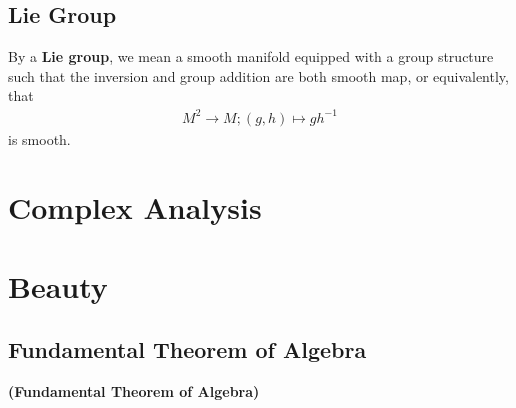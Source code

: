 \documentclass{report}
\begin{document}
\section{Lie Group}
\begin{mdframed}
By a \textbf{Lie group}, we mean a smooth manifold equipped with a group structure such that the inversion and group addition are both smooth map, or equivalently, that 
\begin{align*}
M^2\rightarrow  M; (g,h)\mapsto gh^{-1}
\end{align*}
is smooth. 
\end{mdframed}
\chapter{Complex Analysis}
\chapter{Beauty}
\label{Beauty}
\section{Fundamental Theorem of Algebra}
\begin{theorem}
\textbf{(Fundamental Theorem of Algebra)}
\end{theorem}
\end{document}
